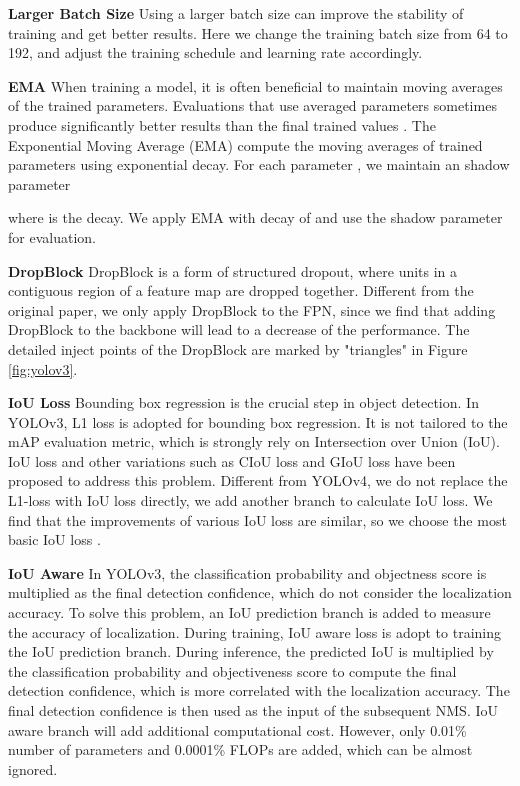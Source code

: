 \documentclass[10pt,twocolumn,letterpaper]{article}
\newcommand{\pheadB}[1] {\vspace{1mm}\noindent\textbf{#1}}
\begin{document}
	\pheadB{Larger Batch Size}
	Using a larger batch size can improve the stability of training and get better results. Here we change the training batch size from 64 to 192, and adjust the training schedule and learning rate accordingly. 
	
	\pheadB{EMA} 
	When training a model, it is often beneficial to maintain moving averages of the trained parameters. Evaluations that use averaged parameters sometimes produce significantly better results than the final trained values  \cite{Mingxing2020EfficientDet}.
	The Exponential Moving Average (EMA) compute the moving averages of trained parameters using exponential decay. For each parameter , we maintain an shadow parameter
	
	where  is the decay.  We apply EMA with decay  of  and use the shadow parameter  for evaluation.
	
	\pheadB{DropBlock} \cite{dropblock}
	DropBlock is a form of structured dropout, where units in a contiguous region of a feature map are dropped together. Different from the original paper, we only apply DropBlock to the FPN, since we find that adding DropBlock to the backbone will lead to a decrease of the performance.
	The detailed inject points of the DropBlock are marked by "triangles" in Figure \ref{fig:yolov3}.
	
	\pheadB{IoU Loss} \cite{iouloss}
	Bounding box regression is the crucial step in object detection. In YOLOv3, L1 loss is adopted for bounding box regression. It is not tailored to the mAP evaluation metric, which is strongly rely on Intersection over Union (IoU). IoU loss and other variations such as CIoU loss and GIoU loss\cite{diouloss,giouloss} have been proposed to address this problem. Different from YOLOv4, we do not replace the L1-loss with IoU loss directly, we add another branch to calculate IoU loss. We find that the improvements of various IoU loss are similar, so we choose the most basic IoU loss \cite{iouloss}. 
	
	\pheadB{IoU Aware} \cite{iouaware}
	In YOLOv3, the classification probability and objectness score is multiplied as the final detection confidence, which do not consider the localization accuracy. 
	To solve this problem, an IoU prediction branch is added to measure the accuracy of localization. During training, IoU aware loss is adopt to training the IoU prediction branch.
	During inference, the predicted IoU is multiplied by the classification probability and objectiveness score to compute the final detection confidence, which is more correlated with the localization accuracy. The final detection confidence is then used as the input of the subsequent NMS. IoU aware branch will add additional computational cost. However, only 0.01\% number of parameters and 0.0001\% FLOPs are added, which can be almost ignored.
	
\end{document}
